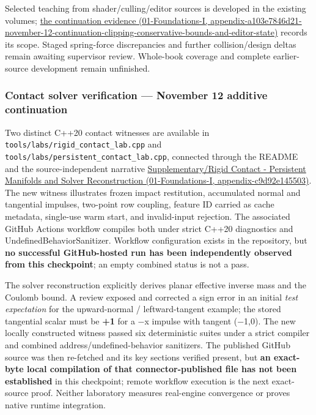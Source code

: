 Selected teaching from shader/culling/editor sources is developed in the existing volumes; \href{../01-Foundations-I/main.pdf\#nameddest=appendix-a103e7846d21-november-12-continuation-clipping-conservative-bounds-and-editor-state}{the continuation evidence (01-Foundations-I, appendix-a103e7846d21-november-12-continuation-clipping-conservative-bounds-and-editor-state)} records its scope. Staged spring-force discrepancies and further collision/design deltas remain awaiting supervisor review. Whole-book coverage and complete earlier-source development remain unfinished.

\subsubsection{Contact solver verification --- November 12 additive continuation}\label{appendix-3b67654799a2-contact-solver-verification-november-12-additive-continuation}

Two distinct C++20 contact witnesses are available in \texttt{tools/labs/rigid\_contact\_lab.cpp} and \texttt{tools/labs/persistent\_contact\_lab.cpp}, connected through the README and the source-independent narrative \href{../01-Foundations-I/main.pdf\#nameddest=appendix-c9d92e145503}{Supplementary/Rigid Contact - Persistent Manifolds and Solver Reconstruction (01-Foundations-I, appendix-c9d92e145503)}. The new witness illustrates frozen impact restitution, accumulated normal and tangential impulses, two-point row coupling, feature ID carried as cache metadata, single-use warm start, and invalid-input rejection. The associated GitHub Actions workflow compiles both under strict C++20 diagnostics and UndefinedBehaviorSanitizer. Workflow configuration exists in the repository, but \textbf{no successful GitHub-hosted run has been independently observed from this checkpoint}; an empty combined status is not a pass.

The solver reconstruction explicitly derives planar effective inverse mass and the Coulomb bound. A review exposed and corrected a sign error in an initial \emph{test expectation} for the upward-normal / leftward-tangent example; the stored tangential scalar must be \textbf{+1} for a −x impulse with tangent (−1,0). The new locally constructed witness passed six deterministic suites under a strict compiler and combined address/undefined-behavior sanitizers. The published GitHub source was then re-fetched and its key sections verified present, but \textbf{an exact-byte local compilation of that connector-published file has not been established} in this checkpoint; remote workflow execution is the next exact-source proof. Neither laboratory measures real-engine convergence or proves native runtime integration.

